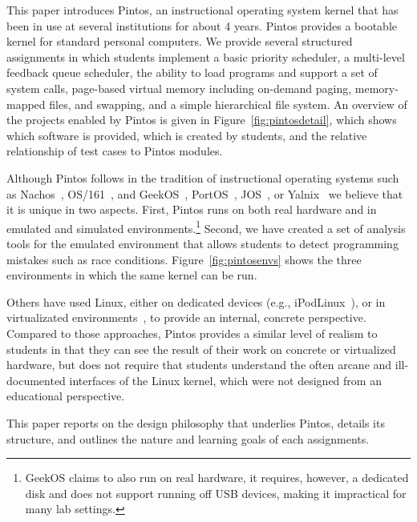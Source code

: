 This paper introduces Pintos, an instructional operating system kernel that 
has been in use at several institutions for about 4 years.  Pintos provides 
a bootable kernel for standard personal computers.  We provide several
structured assignments in which students implement a basic priority
scheduler, a multi-level feedback queue scheduler, the ability to
load programs and support a set of system calls, page-based virtual memory
including on-demand paging, memory-mapped files, and swapping, and a
simple hierarchical file system.  An overview of the projects enabled
by Pintos is given in Figure~\ref{fig:pintosdetail}, which shows which
software is provided, which is created by students, and the relative 
relationship of test cases to Pintos modules.

Although Pintos follows in the tradition of instructional operating systems 
such as Nachos~\cite{Christopher1993Nachos}, OS/161~\cite{Holland2002New}, and
GeekOS~\cite{Hovemeyer2004Running}, 
PortOS~\cite{Atkin2002PortOS},
JOS~\cite{1088822}, or Yalnix~\cite{1088822} 
we believe that it is unique in two
aspects.  First, Pintos runs on both real hardware and in emulated and
simulated environments.\footnote{GeekOS claims to also run on real hardware, it requires,
however, a dedicated disk and does not support running off USB devices, making
it impractical for many lab settings.}
Second, we have created a set of analysis tools
for the emulated environment that allows students to detect programming
mistakes such as race conditions.  Figure~\ref{fig:pintosenvs} shows
the three environments in which the same kernel can be run.

Others have used Linux, either on dedicated devices (e.g., iPodLinux~\cite{1352199}),
or in virtualizated environments~\cite{1008027,1352648,Nieh2005Experiences}, to provide
an internal, concrete perspective.  Compared to those approaches, Pintos provides
a similar level of realism to students in that they can see the result of their
work on concrete or virtualized hardware, but does not require that students 
understand the often arcane and ill-documented interfaces of the Linux kernel,
which were not designed from an educational perspective.

This paper reports on the design philosophy that underlies Pintos,
details its structure, and outlines the nature and learning goals of each
assignments.

\pintosenvfigure{}

\pintosdetailfigure{}



